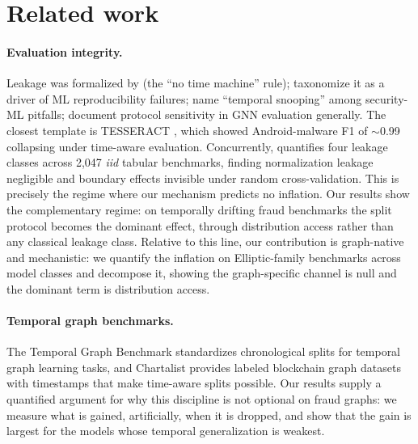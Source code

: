 \documentclass{article}
\begin{document}
\section{Related work}
\paragraph{Evaluation integrity.} Leakage was formalized by \citet{kaufman2011leakage}
(the ``no time machine'' rule); \citet{kapoor2023leakage} taxonomize it as a driver
of ML reproducibility failures; \citet{arp2022dos} name ``temporal snooping'' among
security-ML pitfalls; \citet{shchur2018pitfalls} document protocol sensitivity in
GNN evaluation generally. The closest template is TESSERACT
\citep{pendlebury2019tesseract}, which showed Android-malware F1 of $\sim$0.99
collapsing under time-aware evaluation. Concurrently, \citet{roth2026leakage}
quantifies four leakage classes across 2{,}047 \emph{iid} tabular benchmarks,
finding normalization leakage negligible and boundary effects invisible under
random cross-validation. This is precisely the regime where our mechanism
predicts no inflation. Our results show the complementary regime: on temporally
drifting fraud benchmarks the split protocol becomes the dominant effect, through
distribution access rather than any classical leakage class. Relative to this
line, our contribution is graph-native and mechanistic: we quantify the inflation
on Elliptic-family benchmarks across model classes and decompose it, showing the
graph-specific channel is null and the dominant term is distribution access.

\paragraph{Temporal graph benchmarks.} The Temporal Graph Benchmark
\citep{huang2023tgb} standardizes chronological splits for temporal graph
learning tasks, and Chartalist \citep{shamsi2022chartalist} provides labeled
blockchain graph datasets with timestamps that make time-aware splits possible.
Our results supply a quantified argument for why this discipline is not optional
on fraud graphs: we measure what is gained, artificially, when it is dropped, and
show that the gain is largest for the models whose temporal generalization is
weakest.
\end{document}
